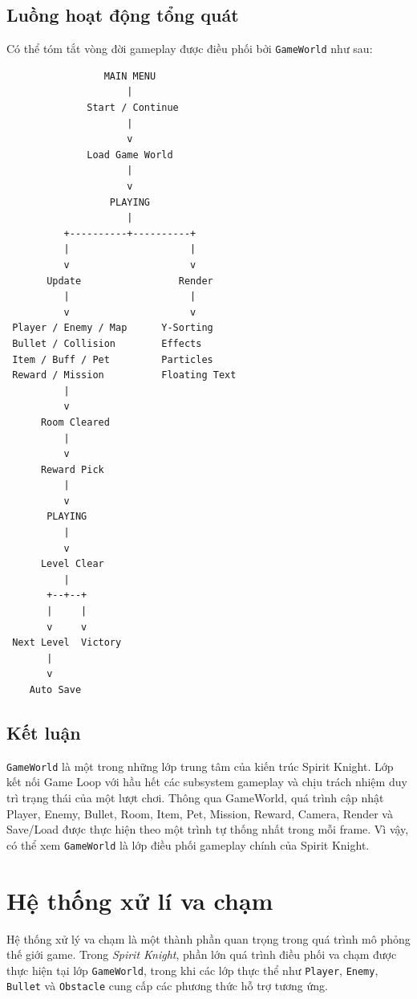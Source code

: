\documentclass[12pt,a4paper]{report}
\begin{document}
    \section{Luồng hoạt động tổng quát}
    Có thể tóm tắt vòng đời gameplay được điều phối bởi
    \texttt{GameWorld} như sau:
    \begin{verbatim}
                 MAIN MENU
                     |
              Start / Continue
                     |
                     v
              Load Game World
                     |
                     v
                  PLAYING
                     |
          +----------+----------+
          |                     |
          v                     v
       Update                 Render
          |                     |
          v                     v
 Player / Enemy / Map      Y-Sorting
 Bullet / Collision        Effects
 Item / Buff / Pet         Particles
 Reward / Mission          Floating Text
          |
          v
      Room Cleared
          |
          v
      Reward Pick
          |
          v
       PLAYING
          |
          v
      Level Clear
          |
       +--+--+
       |     |
       v     v
 Next Level  Victory
       |
       v
    Auto Save
    \end{verbatim}


    \section{Kết luận}
    \texttt{GameWorld} là một trong những lớp trung tâm của kiến trúc
    Spirit Knight. Lớp kết nối Game Loop với hầu hết các subsystem
    gameplay và chịu trách nhiệm duy trì trạng thái của một lượt chơi.
    Thông qua GameWorld, quá trình cập nhật Player, Enemy, Bullet,
    Room, Item, Pet, Mission, Reward, Camera, Render và Save/Load
    được thực hiện theo một trình tự thống nhất trong mỗi frame.
    Vì vậy, có thể xem \texttt{GameWorld} là lớp điều phối gameplay
    chính của Spirit Knight.


    \chapter{Hệ thống xử lí va chạm}
    Hệ thống xử lý va chạm là một thành phần quan trọng trong quá trình
    mô phỏng thế giới game. Trong \textit{Spirit Knight}, phần lớn quá
    trình điều phối va chạm được thực hiện tại lớp
    \texttt{GameWorld}, trong khi các lớp thực thể như
    \texttt{Player}, \texttt{Enemy}, \texttt{Bullet} và
    \texttt{Obstacle} cung cấp các phương thức hỗ trợ tương ứng.
\end{document}
